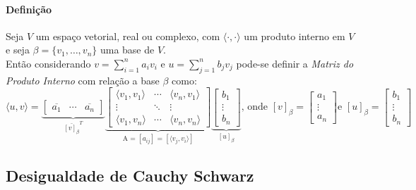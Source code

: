\documentclass{article}
\begin{document}
            \paragraph{Definição}Seja $V$ um espaço vetorial, real ou complexo, com $\langle\cdot,\cdot\rangle$ um produto interno em $V$ e seja $\beta = \{v_{1}, \dots, v_{n}\}$ uma base de $V$.\\
            Então considerando $v = \sum\limits_{i = 1}^{n} a_{i} v_{i}$ e $u = \sum\limits_{j = 1}^{n} b_{j} v_{j}$ pode-se definir a \textit{Matriz do Produto Interno} com relação a base $\beta$ como:
                \[\boxed{\langle u, v\rangle = 
                    \underbrace{
                        \begin{bmatrix} \overline{a_{1}} & \cdots & \overline{a_{n}} \end{bmatrix}}_{\bar{[v]_{\beta}}^{T}}
                        \underbrace{
                            \begin{bmatrix}
                                \langle v_{1}, v_{1}\rangle & \cdots & \langle v_{n}, v_{1}\rangle\\
                                \vdots                      & \ddots & \vdots\\
                                \langle v_{1}, v_{n}\rangle & \cdots & \langle v_{n}, v_{n}\rangle
                            \end{bmatrix}
                        }_{\text{A = $[a_{ij}]$ = $[\langle v_{j}, v_{i}\rangle]$}}
                    \underbrace{
                        \begin{bmatrix} b_{1}\\ \vdots\\ b_{n} \end{bmatrix}}_{[u]_{\beta}} \text{, onde }
                [v]_{\beta} = \begin{bmatrix} a_{1}\\ \vdots\\ a_{n} \end{bmatrix} \text{e } 
                [u]_{\beta} = \begin{bmatrix} b_{1}\\ \vdots\\ b_{n} \end{bmatrix}}\]

        \subsection{Desigualdade de Cauchy Schwarz}
\end{document}
